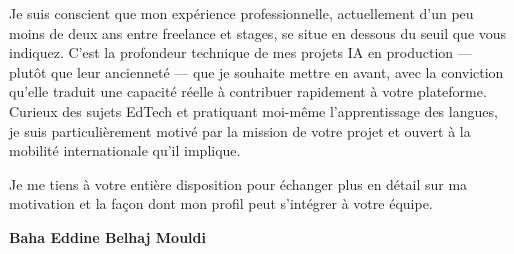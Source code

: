 \documentclass[a4paper,11pt]{article}
\begin{document}
Je suis conscient que mon expérience professionnelle, actuellement d'un peu moins de deux ans entre freelance et stages, se situe en dessous du seuil que vous indiquez. C'est la profondeur technique de mes projets IA en production --- plutôt que leur ancienneté --- que je souhaite mettre en avant, avec la conviction qu'elle traduit une capacité réelle à contribuer rapidement à votre plateforme. Curieux des sujets EdTech et pratiquant moi-même l'apprentissage des langues, je suis particulièrement motivé par la mission de votre projet et ouvert à la mobilité internationale qu'il implique.

Je me tiens à votre entière disposition pour échanger plus en détail sur ma motivation et la façon dont mon profil peut s'intégrer à votre équipe.

\vspace{0.8cm}

\begin{flushright}
{\bfseries Baha Eddine Belhaj Mouldi}
\end{flushright}
\end{document}
